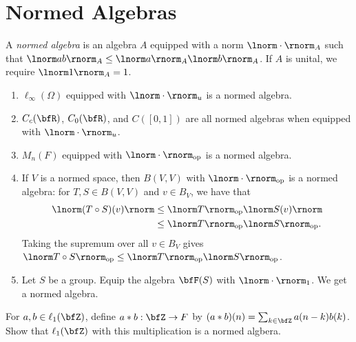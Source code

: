     

\section{Normed Algebras}
    \begin{definition}
        A \textit{normed algebra} is an algebra $A$ equipped with a norm $\lnorm \cdot \rnorm_A$ such that $\lnorm ab \rnorm_A \leq \lnorm a \rnorm_A \lnorm b \rnorm_A$. If $A$ is unital, we require $\lnorm 1 \rnorm_A = 1$.
    \end{definition}

    \begin{example}
        \phantom{a}
        \begin{enumerate}[label = (\arabic*),itemsep=1pt,topsep=3pt]
            \item $\ell_\infty(\Omega)$ equipped with $\lnorm \cdot \rnorm_u$ is a normed algebra.
            \item $C_c(\bfR)$, $C_0(\bfR)$, and $C([0,1])$ are all normed algebras when equipped with $\lnorm \cdot \rnorm_u$.
            \item $M_n(F)$ equipped with $\lnorm \cdot \rnorm_\text{op}$ is a normed algebra.
            \item If $V$ is a normed space, then $B(V,V)$ with $\lnorm \cdot \rnorm_\text{op}$ is a normed algebra: for $T,S \in B(V,V)$ and $v \in B_V$, we have that
                \begin{equation*}
                \begin{split}
                    \lnorm (T \circ S)(v) \rnorm
                    & \leq \lnorm T \rnorm_\text{op}\lnorm S(v) \rnorm \\
                    & \leq \lnorm T \rnorm_\text{op}\lnorm S \rnorm_\text{op}.
                \end{split}
                \end{equation*}
            Taking the supremum over all $v \in B_V$ gives $\lnorm T \circ S \rnorm_\text{op} \leq \lnorm T \rnorm_\text{op}\lnorm S \rnorm_\text{op}$.

            \item Let $S$ be a group. Equip the algebra $\bfF(S)$ with $\lnorm \cdot \rnorm_1$. We get a normed algebra.
        \end{enumerate}
    \end{example}

    \begin{exercise}
        For $a,b \in \ell_1(\bfZ)$, define $a\ast b :\bfZ \rightarrow F$ by $(a \ast b)(n) = \sum_{k \in \bfZ}a(n-k)b(k)$. Show that $\ell_1(\bfZ)$ with this multiplication is a normed algbera.
    \end{exercise}
    

    




    
    
